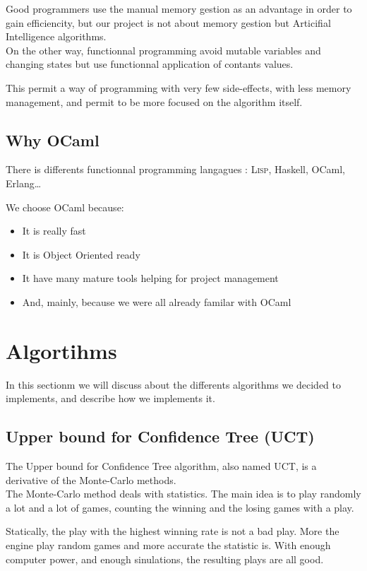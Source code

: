Good programmers use the manual memory gestion as an advantage in order to gain efficiencity, but our project is not about memory gestion but Articifial Intelligence algorithms.\\

On the other way, functionnal programming avoid mutable variables and changing states but use functionnal application of contants values.

This permit a way of programming with very few side-effects, with less memory management, and permit to be more focused on the algorithm itself.

\subsection{Why OCaml}

There is differents functionnal programming langagues : \textsc{Lisp}, Haskell, OCaml, Erlang\ldots

We choose OCaml because:
\begin{itemize}
\item It is really fast
\item It is Object Oriented ready
\item It have many mature tools helping for project management
\item And, mainly, because we were all already familar with OCaml
\end{itemize}


\section{Algortihms}

In this sectionm we will discuss about the differents algorithms we decided to implements, and describe how we implements it.

\subsection{Upper bound for Confidence Tree (\textsc{UCT})}

The Upper bound for Confidence Tree algorithm, also named UCT, is a derivative of the Monte-Carlo methods.\\

The Monte-Carlo method deals with statistics. The main idea is to play randomly a lot and a lot of games, counting the winning and the losing games with a play.

Statically, the play with the highest winning rate is not a bad play. More the engine play random games and more accurate the statistic is. With enough computer power, and enough sinulations, the resulting plays are all good.\\

